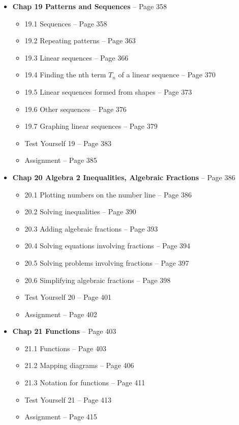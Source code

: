 \documentclass{article}
\begin{document}
\begin{itemize}
    \item \textbf{Chap 19 Patterns and Sequences} -- Page 358
    \begin{itemize}
        \item 19.1 Sequences -- Page 358
        \item 19.2 Repeating patterns -- Page 363
        \item 19.3 Linear sequences -- Page 366
        \item 19.4 Finding the nth term $T_n$ of a linear sequence -- Page 370
        \item 19.5 Linear sequences formed from shapes -- Page 373
        \item 19.6 Other sequences -- Page 376
        \item 19.7 Graphing linear sequences -- Page 379
        \item Test Yourself 19 -- Page 383
        \item Assignment -- Page 385
    \end{itemize}

    \item \textbf{Chap 20 Algebra 2 Inequalities, Algebraic Fractions} -- Page 386
    \begin{itemize}
        \item 20.1 Plotting numbers on the number line -- Page 386
        \item 20.2 Solving inequalities -- Page 390
        \item 20.3 Adding algebraic fractions -- Page 393
        \item 20.4 Solving equations involving fractions -- Page 394
        \item 20.5 Solving problems involving fractions -- Page 397
        \item 20.6 Simplifying algebraic fractions -- Page 398
        \item Test Yourself 20 -- Page 401
        \item Assignment -- Page 402
    \end{itemize}

    \item \textbf{Chap 21 Functions} -- Page 403
    \begin{itemize}
        \item 21.1 Functions -- Page 403
        \item 21.2 Mapping diagrams -- Page 406
        \item 21.3 Notation for functions -- Page 411
        \item Test Yourself 21 -- Page 413
        \item Assignment -- Page 415
    \end{itemize}


\end{itemize}
\end{document}
